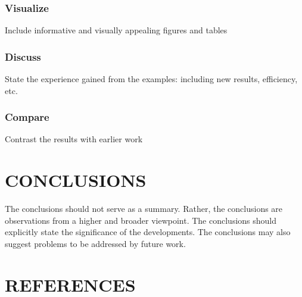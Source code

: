 \documentclass{ICASP13Paper}
\begin{document}
\subsubsection{Visualize}
Include informative and visually appealing figures and tables

\subsubsection{Discuss}
State the experience gained from the examples: including new results, 
efficiency, etc.

\subsubsection{Compare}
Contrast the results with earlier work

\section{CONCLUSIONS}
The conclusions should not serve as a summary. Rather, the conclusions are 
observations from a higher and broader viewpoint. The conclusions should 
explicitly state the significance of the developments. The conclusions may also 
suggest problems to be addressed by future work.





\section{REFERENCES}
{\small


}
\end{document}
